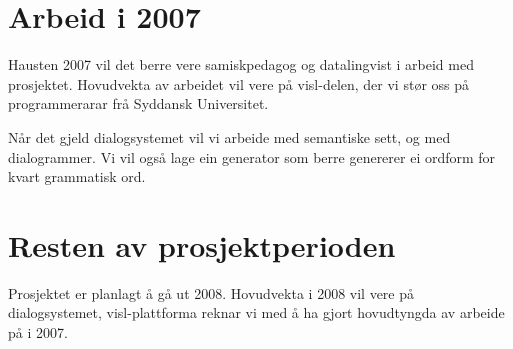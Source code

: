\documentclass[a4paper,norsk]{article}
\begin{document}
\section{Arbeid i 2007}

Hausten 2007 vil det berre vere samiskpedagog og datalingvist i arbeid med prosjektet. Hovudvekta av arbeidet vil vere på visl-delen, der vi stør oss på programmerarar frå Syddansk Universitet.

Når det gjeld dialogsystemet vil vi arbeide med semantiske sett, og med dialogrammer. Vi vil også lage ein generator som berre genererer ei ordform for kvart grammatisk ord.

\section{Resten av prosjektperioden}

Prosjektet er planlagt å gå ut 2008. Hovudvekta i 2008 vil vere på dialogsystemet, visl-plattforma reknar vi med å ha gjort hovudtyngda av arbeide på i 2007. 
\end{document}
